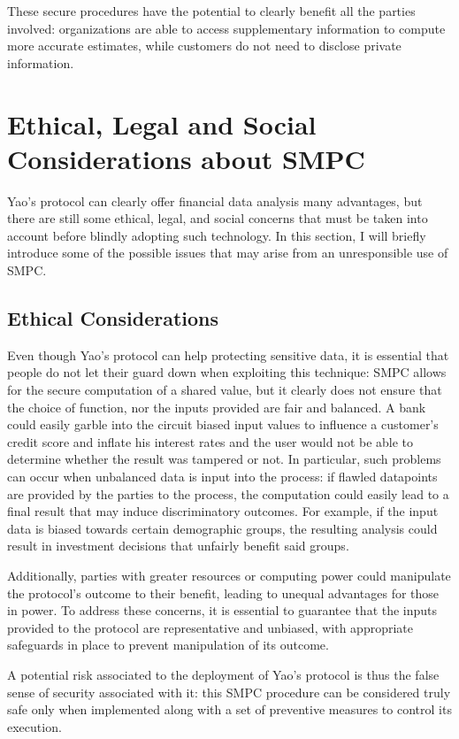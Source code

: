 \documentclass[12pt]{article}
\begin{document}
These secure procedures have the potential to clearly benefit all the parties involved: organizations are able to access supplementary information to compute more accurate estimates, while customers do not need to disclose private information.

\section{Ethical, Legal and Social Considerations about SMPC}\label{sec:sel}

Yao's protocol can clearly offer financial data analysis many advantages, but there are still some ethical, legal, and social concerns that must be taken into account before blindly adopting such technology. In this section, I will briefly introduce some  of the possible issues that may arise from an unresponsible use of SMPC.

\subsection{Ethical Considerations}

Even though Yao's protocol can help protecting sensitive data, it is essential that people do not let their guard down when exploiting this technique: SMPC allows for the secure computation of a shared value, but it clearly does not ensure that the choice of function, nor the inputs provided are fair and balanced. A bank could easily garble into the circuit biased input values to influence a customer's credit score and inflate his interest rates and the user would not be able to determine whether the result was tampered or not. In particular, such problems can occur when unbalanced data is input into the process: if flawled datapoints are provided by the parties to the process, the computation could easily lead to a final result that may induce discriminatory outcomes. For example, if the input data is biased towards certain demographic groups, the resulting analysis could result in investment decisions that unfairly benefit said groups.

Additionally, parties with greater resources or computing power could manipulate the protocol's outcome to their benefit, leading to unequal advantages for those in power. To address these concerns, it is essential to guarantee that the inputs provided to the protocol are representative and unbiased, with appropriate safeguards in place to prevent manipulation of its outcome.

A potential risk associated to the deployment of Yao's protocol is thus the false sense of security associated with it: this SMPC procedure can be considered truly safe only when implemented along with a set of preventive measures to control its execution.
\end{document}

